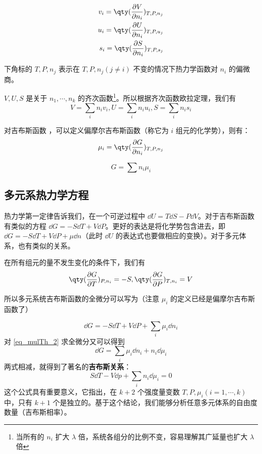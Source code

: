 \begin{equation}
\begin{aligned}
v_i=\qty(\frac{\partial V}{\partial n_i})_{T,P,n_j}\\
u_i=\qty(\frac{\partial U}{\partial n_i})_{T,P,u_j}\\
s_i=\qty(\frac{\partial S}{\partial n_i})_{T,P,s_j}
\end{aligned}
\end{equation}

下角标的 $T,P,n_j$ 表示在 $T,P,n_j(j\neq i)$ 不变的情况下热力学函数对 $n_i$ 的偏微商。

$V,U,S$ 是关于 $n_1,\cdots,n_k$ 的齐次函数\footnote{当所有的 $n_i$ 扩大 $\lambda$ 倍，系统各组分的比例不变，容易理解其广延量也扩大 $\lambda$ 倍}。所以根据齐次函数欧拉定理，我们有
\begin{equation}
V=\sum_i n_iv_i,U=\sum_i n_iu_i,S=\sum_i n_is_i
\end{equation}

对吉布斯函数 ，可以定义偏摩尔吉布斯函数（称它为 $i$ 组元的化学势），则有：
\begin{equation}\label{eq_mulTh_4}
\mu_i=\qty(\frac{\partial G}{\partial n_i})_{T,P,n_j}
\end{equation}

\begin{equation}\label{eq_mulTh_2}
G=\sum n_i \mu_i
\end{equation}

\subsection{多元系热力学方程}
热力学第一定律告诉我们，在一个可逆过程中 $\dd U=T\dd S-P\dd V$。对于吉布斯函数有类似的方程 $\dd G=-S\dd T+V\dd P$。更好的表达是将化学势包含进去，即 $\dd G=-S\dd T+V\dd P+\mu\dd n$（此时 $\dd U$ 的表达式也要做相应的变换）。对于多元体系，也有类似的关系。

在所有组元的量不发生变化的条件下，我们有
\begin{equation}
\qty(\frac{\partial G}{\partial T})_{P,n_i}=-S,\qty(\frac{\partial G}{\partial P})_{T,n_i}=V
\end{equation}

所以多元系统吉布斯函数的全微分可以写为（注意 $\mu_i$ 的定义已经是偏摩尔吉布斯函数了）

\begin{equation}\label{eq_mulTh_3}
\dd G=-S\dd T+V\dd P+\sum_i\mu_i\dd n_i
\end{equation}
对 \autoref{eq_mulTh_2} 求全微分又可以得到
\begin{equation}
\dd G=\sum_i\mu_i\dd n_i+n_i\dd \mu_i
\end{equation}
两式相减，就得到了著名的\textbf{吉布斯关系}：
\begin{equation}
S\dd T-V\dd p+\sum_i n_i\dd \mu_i=0
\end{equation}
这个公式具有重要意义，它指出，在 $k+2$ 个强度量变数 $T,P,\mu_i(i=1,\cdots,k)$ 中，只有 $k+1$ 个是独立的。基于这个结论，我们能够分析任意多元体系的自由度数量（吉布斯相率）。

